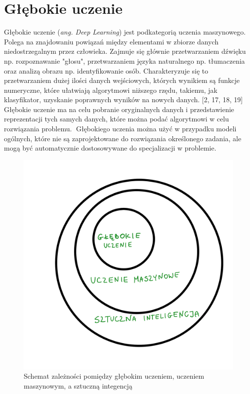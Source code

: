 \documentclass[openright]{xmgr}
\begin{document}
\section{Głębokie uczenie }

\indent \indent Głębokie uczenie (\textit{ang. Deep Learning}) jest podkategorią uczenia maszynowego. Polega na znajdowaniu powiązań między elementami w zbiorze danych niedostrzegalnym przez człowieka. Zajmuje się głównie przetwarzaniem dźwięku np. rozpoznawanie "głosu", przetwarzaniem języka naturalnego np. tłumaczenia oraz analizą obrazu np. identyfikowanie osób. Charakteryzuje się to przetwarzaniem dużej ilości danych wejściowych, których wynikiem są funkcje numeryczne, które ułatwiają algorytmowi niższego rzędu, takiemu, jak klasyfikator, uzyskanie poprawnych wyników na nowych danych. [2, 17, 18, 19] Głębokie uczenie ma na celu pobranie oryginalnych danych i przedstawienie reprezentacji tych samych danych, które można podać algorytmowi w celu rozwiązania problemu. 
􏰁Głębokiego uczenia można użyć w przypadku modeli ogólnych, które nie są zaprojektowane do rozwiązania określonego zadania, ale mogą być automatycznie dostosowywane do specjalizacji w problemie.

\begin{figure}[!tbh]
\centering
\includegraphics[width=.8\hsize]{fig/1}
\caption{Schemat zależności pomiędzy głębokim uczeniem, uczeniem maszynowym, a sztuczną integencją\label{RYS.1}}
\end{figure}
\end{document}
